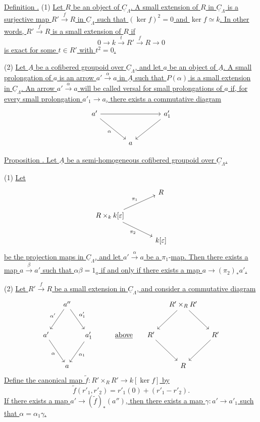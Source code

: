 
\underline{Definition .} (1) \underline{Let $R$ be an object of
$\underline C_\Lambda$. A small extension of $R$ in
$\underline C_\Lambda$ is a surjective map
$R'\xrightarrow{f}R$ in $\underline C_\Lambda$ such that
$(\ker f)^2=0$ and $\ker f\simeq k$. In other words,
$R'\xrightarrow{f}R$ is a small extension of $R$ if}
\[
0\longrightarrow k\xrightarrow{t}R'\xrightarrow{f}R
 \longrightarrow0
\]
\underline{is exact for some $t\in R'$ with $t^2=0$.}

(2) \underline{Let $\underline A$ be a cofibered groupoid over
$\underline C_\Lambda$, and let $a$ be an object of $\underline A$.
A small prolongation of $a$ is an arrow
$a'\xrightarrow{\alpha}a$ in $\underline A$ such that $P(\alpha)$ is
a small extension in $\underline C_\Lambda$. An arrow
$a'\xrightarrow{\alpha}a$ will be called versal for small
prolongations of $a$ if, for every small prolongation
$a'_1\longrightarrow a$, there exists a commutative diagram}
\[
\begin{tikzcd}[row sep=large,column sep=large]
a' \arrow[rr] \arrow[dr,"\alpha"'] & & a'_1 \arrow[dl] \\
& a &
\end{tikzcd}
\]

\underline{Proposition . Let $\underline A$ be a semi-homogeneous
cofibered groupoid over $\underline C_\Lambda$.}

(1) \underline{Let}
\[
\begin{tikzcd}[column sep=large]
& R \\
R\times_k k[\varepsilon]
 \arrow[ur,"\pi_1"] \arrow[dr,"\pi_2"'] & \\
& k[\varepsilon]
\end{tikzcd}
\]
\underline{be the projection maps in $\underline C_\Lambda$, and let
$a'\xrightarrow{\alpha}a$ be a }$\pi_1$-\underline{map. Then there exists a map
$a\xrightarrow{\beta}a'$ such that $\alpha\beta=1_a$ if and only if
there exists a map $a\longrightarrow(\pi_2)_*a'$.}


(2) \underline{Let $R'\xrightarrow{f}R$ be a small extension in
$\underline C_\Lambda$, and consider a commutative diagram}
\[
\begin{tikzcd}[row sep=large,column sep=small]
& a'' \arrow[dl,"\alpha'"'] \arrow[dr,"\alpha'_1"]
  & & & & & R'\times_RR' \arrow[dl] \arrow[dr] & \\
a' \arrow[dr,"\alpha"'] & & a'_1 \arrow[dl,"\alpha_1"]
  & & \underline{\text{above}} & R' \arrow[dr] & & R' \arrow[dl] \\
& a & & & & & R &
\end{tikzcd}
\]
\underline{Define the canonical map
$\widetilde f:R'\times_RR'\longrightarrow k[\ker f]$ by}
\[
 \widetilde f(r'_1,r'_2)=r'_1(0)+(r'_1-r'_2).
\]
\underline{If there exists a map
$a'\longrightarrow(\widetilde f)_*(a'')$, then there exists a map
$\gamma:a'\longrightarrow a'_1$ such that
$\alpha=\alpha_1\gamma$.}

